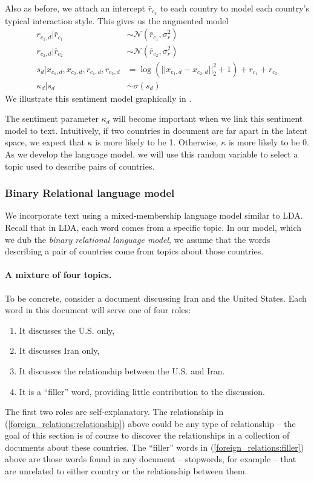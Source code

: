 Also as before, we attach an intercept $\bar r_{c_2}$ to each country
to model each country's typical interaction style.  This gives us the augmented model
\begin{align}
  r_{c_1,d} | \bar r_{c_1} & \sim \mathcal{N}(\bar r_{c_1}, \sigma_r^2) \nonumber \\
  r_{c_2,d} | \bar r_{c_2} & \sim \mathcal{N}(\bar r_{c_2}, \sigma_r^2) \nonumber \\
  s_d | x_{c_1,d}, x_{c_2,d}, r_{c_1,d}, r_{c_2,d} & = \log( || x_{c_1,d} - x_{c_2,d} ||_2^2 + 1)  + r_{c_1} + r_{c_2} \nonumber \\
  \kappa_d | s_d & \sim \sigma(s_d)
\end{align}
We illustrate this sentiment model graphically in .

The sentiment parameter $\kappa_d$ will become important when we link
this sentiment model to text.  Intuitively, if two countries in
document are far apart in the latent space, we expect that $\kappa$ is
more likely to be 1.  Otherwise, $\kappa$ is more likely to be 0.  As
we develop the language model, we will use this random variable to
select a topic used to describe pairs of countries.

\subsubsection*{Binary Relational language model}
We incorporate text using a mixed-membership language model similar to
LDA.  Recall that in LDA, each word comes from a specific topic.  In
our model, which we dub the \emph{binary relational language model},
we assume that the words describing a pair of countries come from
topics about those countries.

\paragraph{A mixture of four topics.} To be concrete, consider a document discussing Iran and the United
States.  Each word in this document will serve one of
four roles:
\begin{enumerate}
  \item It discusses the U.S. only,
  \item It discusses Iran only,
  \item It discusses the relationship between the U.S. and Iran. \label{foreign_relations:relationship}
  \item It is a ``filler'' word, providing little contribution to the discussion. \label{foreign_relations:filler}
\end{enumerate}
The first two roles are self-explanatory.  The relationship in
(\ref{foreign_relations:relationship}) above could be any type of
relationship -- the goal of this section is of course to discover the
relationships in a collection of documents about these
countries.  The ``filler'' words in
(\ref{foreign_relations:filler}) above are those words found in any document
-- stopwords, for example -- that are unrelated to either country or
the relationship between them.

